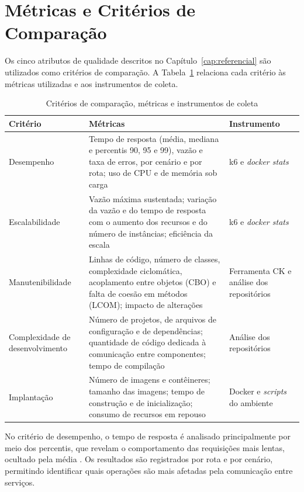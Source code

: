 \section{Métricas e Critérios de Comparação}
\label{sec:metricas}

Os cinco atributos de qualidade descritos no Capítulo~\ref{cap:referencial} são utilizados
como critérios de comparação. A Tabela~\ref{tab:metricas} relaciona cada critério às métricas
utilizadas e aos instrumentos de coleta.

\begin{table}[htbp]
\centering
\caption{Critérios de comparação, métricas e instrumentos de coleta}
\label{tab:metricas}
\small
\begin{tabular}{|>{\raggedright\arraybackslash}p{3.1cm}|>{\raggedright\arraybackslash}p{7.5cm}|>{\raggedright\arraybackslash}p{4.0cm}|}
\hline
\textbf{Critério} & \textbf{Métricas} & \textbf{Instrumento} \\ \hline
Desempenho & Tempo de resposta (média, mediana e percentis 90, 95 e 99), vazão e taxa de erros, por cenário e por rota; uso de CPU e de memória sob carga & k6 e \textit{docker stats} \\ \hline
Escalabilidade & Vazão máxima sustentada; variação da vazão e do tempo de resposta com o aumento dos recursos e do número de instâncias; eficiência da escala & k6 e \textit{docker stats} \\ \hline
Manutenibilidade & Linhas de código, número de classes, complexidade ciclomática, acoplamento entre objetos (CBO) e falta de coesão em métodos (LCOM); impacto de alterações & Ferramenta CK \cite{aniche-ck} e análise dos repositórios \\ \hline
Complexidade de desenvolvimento & Número de projetos, de arquivos de configuração e de dependências; quantidade de código dedicada à comunicação entre componentes; tempo de compilação & Análise dos repositórios \\ \hline
Implantação & Número de imagens e contêineres; tamanho das imagens; tempo de construção e de inicialização; consumo de recursos em repouso & Docker e \textit{scripts} do ambiente \\ \hline
\end{tabular}
\par\vspace{4pt}{\footnotesize Fonte: Elaborada pelo autor (2026).}
\end{table}

No critério de desempenho, o tempo de resposta é analisado principalmente por meio dos
percentis, que revelam o comportamento das requisições mais lentas, ocultado pela média
\cite{jain1991}. Os resultados são registrados por rota e por cenário, permitindo identificar
quais operações são mais afetadas pela comunicação entre serviços.

